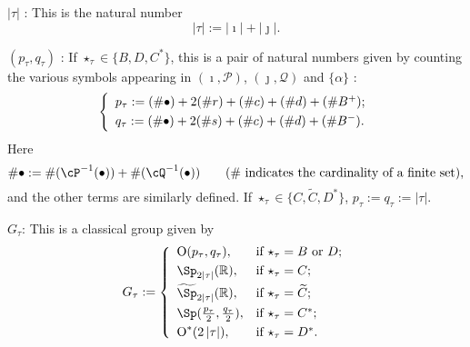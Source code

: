 \documentclass[12pt,a4paper]{amsart}
\def\abs#1{\left|{#1}\right|}
\newcommand{\CO}{{\mathcal {O}}}
\newcommand{\CP}{{\mathcal {P}}}
\newcommand{\CQ}{{\mathcal {Q}}}
\newcommand{\oO}{\operatorname{O}}
\newcommand{\R}{\mathbb R}
\numberwithin{equation}{section}
\theoremstyle{remark}
\begin{document}
 \noindent $\abs{\tau}$ : This is the natural number \[
  \abs{\tau}:=\abs{\imath}+\abs{\jmath}.
\]
\delete{Note that
\[
 \abs{\tau}= \left\{
     \begin{array}{ll}
        \frac{\abs{\check \CO}-1}{2}, &\hbox{if $\star_\tau=C$ or $C^*$}; \smallskip\\
          \frac{\abs{\check \CO}}{2}, &\hbox{otherwise}. \smallskip\\
                      \end{array}
   \right.
\]
}


 

 \smallskip


 \smallskip



  \noindent $(p_{\tau}, q_{\tau})$ : If $\star_\tau\in \{B, D, C^*\}$, this is a pair of natural numbers given by counting  the various symbols appearing in $(\imath, \CP)$, $(\jmath, \CQ)$ and $\{\alpha\}$ :
  \[
  \left\{
     \begin{array}{l}
    p_\tau :=( \# \bullet)+ 2 (\# r) +(\# c )+ (\# d) + (\# B^+);\smallskip\\
    q_\tau :=( \# \bullet)+ 2 (\# s) + (\# c) + (\# d) + (\# B^-).\\
    \end{array}
    \right.
\]
Here 
\[
\#\bullet:=\#(\cP^{-1}(\bullet))+\#(\cQ^{-1}(\bullet))\qquad (\textrm{$\#$ indicates the cardinality of a finite set}),
\] 
and the other terms are similarly defined. 
If $\star_\tau\in \{C, \widetilde C, D^*\}$,  $p_\tau:=q_\tau:=\abs{\tau}$. 

\smallskip


 \smallskip


  \noindent $G_{\tau}$: This is a classical group given by
  \[
 G_\tau:= \left\{
     \begin{array}{ll}
         \oO(p_\tau, q_\tau), &\hbox{if $\star_\tau=B$ or $D$}; \smallskip\\
            \Sp_{2\abs{\tau}}(\R), &\hbox{if $\star_\tau=C$}; \smallskip\\
           \widetilde{\Sp}_{2\abs{\tau}}(\R), &\hbox{if $\star_\tau=\widetilde{ C}$}; \smallskip \\
        \Sp(\frac{p_\tau}{2}, \frac{q_\tau}{2}), &\hbox{if $\star_\tau=C^*$}; \smallskip \\
          \oO^*(2\abs{\tau}), &\hbox{if $\star_\tau=D^*$}.\\
            \end{array}
   \right.
\]
\end{document}

